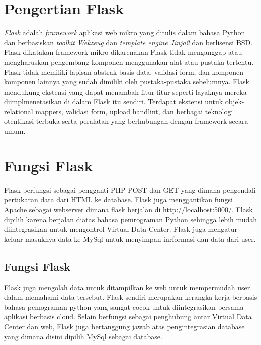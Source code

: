 
\section{Pengertian Flask}
\emph{Flask} adalah \emph{framework} aplikasi web mikro yang ditulis dalam bahasa Python dan berbasiskan \emph{toolkit Wekzeug} dan \emph{template engine Jinja2} dan berlisensi BSD. Flask dikatakan framework mikro dikarenakan Flask tidak menganggap atau mengharuskan pengembang komponen menggunakan alat atau pustaka tertentu. Flask tidak memiliki lapisan abstrak basis data, validasi form, dan komponen-komponen lainnya yang sudah dimiliki oleh pustaka-pustaka sebelumnya. Flask mendukung ekstensi yang dapat menambah fitur-fitur seperti layaknya mereka diimplmenetasikan di dalam Flask itu sendiri. Terdapat ekstensi untuk objek-relational mappers, validasi form, upload handlint, dan berbagai teknologi otentikasi terbuka serta peralatan yang berhubungan dengan framework secara umum\cite{solihin2016implementasi}.

\section{Fungsi Flask}
Flask berfungsi sebagai pengganti PHP POST dan GET yang dimana pengendali pertukaran data dari HTML ke database. Flask juga menggantikan fungsi Apache sebagai webserver dimana flask berjalan di http://localhost:5000/.
Flask dipilih karena berjalan diatas bahasa pemrograman Python sehingga lebih mudah diintegrasikan untuk mengontrol Virtual Data Center. Flask juga mengatur keluar masuknya data ke MySql untuk menyimpan inrformasi dan data dari user\cite{alauddin2017implementasi}.

\subsection{Fungsi Flask}
Flask juga mengolah data untuk ditampilkan ke web untuk mempermudah user dalam memahami data tersebut. Flask sendiri merupakan kerangka kerja berbasis bahasa pemograman python yang sangat cocok untuk diintegrasikan bersama aplikasi berbasis cloud. Selain berfungsi sebagai penghubung antar Virtual Data Center dan web, Flask juga bertanggung jawab atas pengintegrasian database yang dimana disini dipilih MySql sebagai database\cite{alauddin2017implementasi}.


